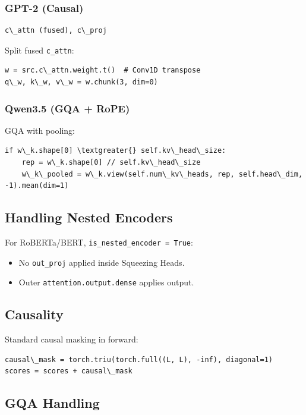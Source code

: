 \subsubsection{GPT-2 (Causal)}

\begin{lstlisting}
c\_attn (fused), c\_proj
\end{lstlisting}

Split fused \texttt{c\_attn}:

\begin{lstlisting}
w = src.c\_attn.weight.t()  # Conv1D transpose
q\_w, k\_w, v\_w = w.chunk(3, dim=0)
\end{lstlisting}

\subsubsection{Qwen3.5 (GQA + RoPE)}

GQA with pooling:

\begin{lstlisting}
if w\_k.shape[0] \textgreater{} self.kv\_head\_size:
    rep = w\_k.shape[0] // self.kv\_head\_size
    w\_k\_pooled = w\_k.view(self.num\_kv\_heads, rep, self.head\_dim, -1).mean(dim=1)
\end{lstlisting}

\subsection{Handling Nested Encoders}

For RoBERTa/BERT, \texttt{is\_nested\_encoder = True}:
\begin{itemize}
\item No \texttt{out\_proj} applied inside Squeezing Heads.
\item Outer \texttt{attention.output.dense} applies output.

\end{itemize}
\subsection{Causality}

Standard causal masking in forward:

\begin{lstlisting}
causal\_mask = torch.triu(torch.full((L, L), -inf), diagonal=1)
scores = scores + causal\_mask
\end{lstlisting}

\subsection{GQA Handling}

